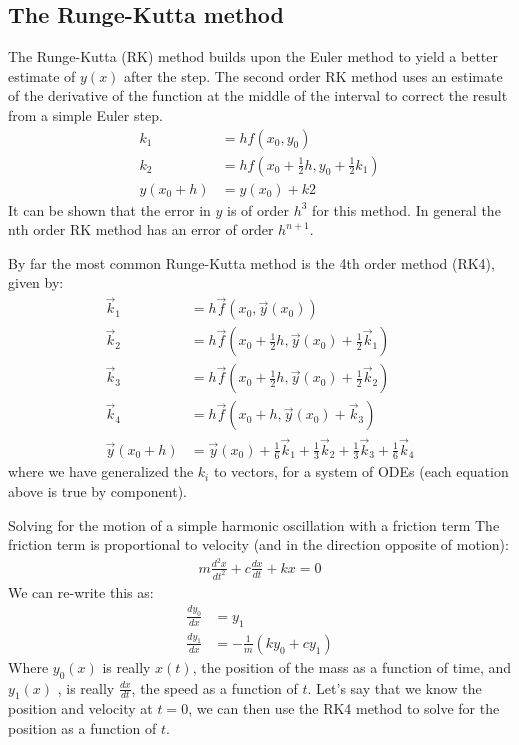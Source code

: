 \subsection{The Runge-Kutta method}

The Runge-Kutta (RK) method builds upon the Euler method to yield a better estimate of $y(x)$ after the step. The second order RK method uses an estimate of the derivative of the function at the middle of the interval to correct the result from a simple Euler step.
\begin{align}
 k_1 &= hf(x_0,y_0) \nonumber\\
 k_2 &= hf(x_0+\frac{1}{2}h,y_0+\frac{1}{2}k_1) \nonumber\\
 y(x_0+h) &= y(x_0)+k2 
\end{align}
It can be shown that the error in $y$ is of order $h^3$ for this method. In general the nth order RK method has an error of order $h^{n+1}$.

By far the most common Runge-Kutta method is the 4th order method (RK4), given by:
\begin{align}
 \vec{k}_1 &= h\vec{f}(x_0,\vec{y}(x_0)) \nonumber\\
 \vec{k}_2 &= h\vec{f}(x_0+\frac{1}{2}h,\vec{y}(x_0)+\frac{1}{2}\vec{k}_1)\nonumber\\ 
 \vec{k}_3 &= h\vec{f}(x_0+\frac{1}{2}h,\vec{y}(x_0)+\frac{1}{2}\vec{k}_2) \nonumber\\
 \vec{k}_4 &= h\vec{f}(x_0+h,\vec{y}(x_0)+\vec{k}_3) \nonumber\\
 \vec{y}(x_0+h) &= \vec{y}(x_0)+\frac{1}{6}\vec{k}_1 +\frac{1}{3}\vec{k}_2 +\frac{1}{3}\vec{k}_3 +\frac{1}{6} \vec{k}_4 
\end{align}
where we have generalized the $k_i$ to vectors, for a system of ODEs (each equation above is true by component).
\begin{example}{0pt}{Solving for the motion of a simple harmonic oscillation with a friction term}{}
 The friction term is proportional to velocity (and in the direction opposite of motion):
\begin{align*}
 m\frac{d^2x}{dt^2}+c\frac{dx}{dt}+kx = 0
\end{align*}
We can re-write this as:
\begin{align*}
 \frac{dy_0}{dx} &= y_1 \nonumber\\
 \frac{dy_1}{dx} &= -\frac{1}{m}(ky_0+cy_1) 
\end{align*}
Where $y_0(x)$ is really $x(t)$, the position of the mass as a function of time, and $y_1(x)$ , is really $\frac{dx}{dt}$, the speed as a function of $t$. Let's say that we know the position and velocity at $t=0$, we can then use the RK4 method to solve for the position as a function of $t$. 
\end{example}


